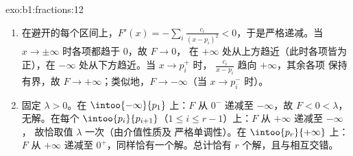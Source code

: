 \begin{solution}{exo:b1:fractions:12}
\begin{enumerate}
  \item 在避开的每个区间上，$F'(x) = -\sum_i
        \frac{c_i}{(x - p_i)^2} < 0$，于是严格递减。当 $x
        \to \pm\infty$ 时各项都趋于 $0$，故 $F \to 0$，
        在 $+\infty$ 处从上方趋近（此时各项皆为正），在
        $-\infty$ 处从下方趋近。当 $x \to p_i^+$ 时，
        $\frac{c_i}{x - p_i}$ 趋向 $+\infty$，其余各项
        保持有界，故 $F \to +\infty$；类似地，$F \to -\infty$（当
        $x \to p_i^-$ 时）。
  \item 固定 $\lambda > 0$。在 $\intoo{-\infty}{p_1}$ 上：$F$
        从 $0^-$ 递减至 $-\infty$，故 $F < 0 < \lambda$，
        无解。在每个 $\intoo{p_i}{p_{i+1}}$（$1 \leq i
        \leq r-1$）上：$F$ 从 $+\infty$ 递减至 $-\infty$，
        故恰取值 $\lambda$ 一次（由介值性质及
        严格单调性）。在
        $\intoo{p_r}{+\infty}$ 上：$F$ 从 $+\infty$ 递减至
        $0^+$，同样恰有一个解。总计恰有 $r$
        个解，且与相互交错。
\end{enumerate}
\end{solution}

